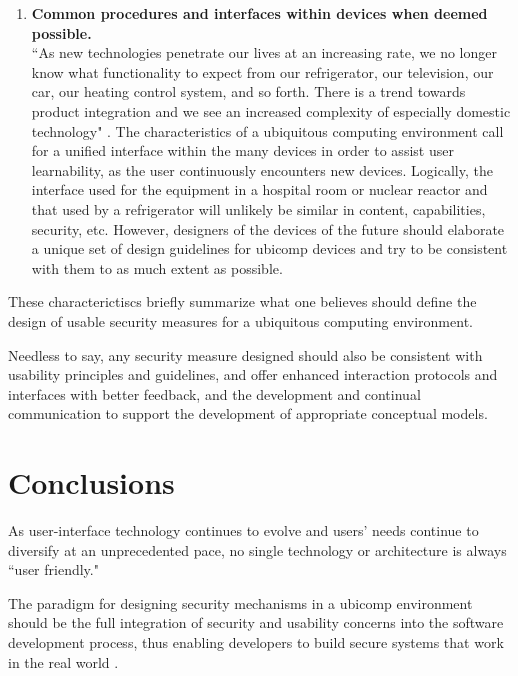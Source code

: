 \documentclass{article}
\begin{document}
\begin{enumerate}
 \item \textbf{Common procedures and interfaces within devices when deemed possible.}\\
 ``As new technologies penetrate our lives at an increasing rate, we no longer know what functionality to expect from our refrigerator, our television, our car, our heating control system, and so forth. There is a trend towards product integration and we see an increased complexity of especially domestic technology" \cite{petersen2002usability}. The characteristics of a ubiquitous computing environment call for a unified interface within the many devices in order to assist user learnability, as the user continuously encounters new devices. Logically, the interface used for the equipment in a hospital room or nuclear reactor and that used by a refrigerator will unlikely be similar in content, capabilities, security, etc. However, designers of the devices of the future should elaborate a unique set of design guidelines for ubicomp devices and try to be consistent with them to as much extent as possible. 
\end{enumerate}

These characterictiscs briefly summarize what one believes should define the design of usable security measures for a ubiquitous computing environment.  

Needless to say, any security measure designed should also be consistent with usability principles and guidelines, and offer enhanced interaction protocols and interfaces with better feedback, and the development and continual communication to support the development of appropriate conceptual models. 


\section{Conclusions}
As user-interface technology continues to evolve and users' needs continue to diversify at an unprecedented pace, no single technology or architecture is always ``user friendly." 

The paradigm for designing security mechanisms in a ubicomp environment should be the full integration of security and usability concerns into the software development process, thus enabling developers to build secure systems that work in the real world \cite{flechais2003bringing}.



\end{document}
